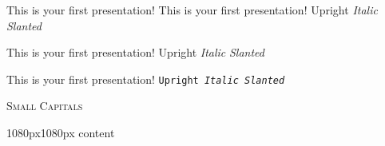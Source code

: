 \documentclass{beamer}
\begin{document}
\begin{frame}

    This is your first presentation!
	\newline
    \rmfamily This is your first presentation!
	\newline
	\textup{Upright} \textit{Italic} \textsl{Slanted}
	\newline


    \sffamily This is your first presentation!
	\newline
	\textsf{Upright  \textit{Italic} \textsl{Slanted}}
	\newline

    \ttfamily This is your first presentation!
	\newline
	\texttt{Upright  \textit{Italic} \textsl{Slanted}}
	\newline

	\textsc{Small Capitals}

\end{frame}

\begin{overlayarea}{1080px}{1080px}
  content
\end{overlayarea}
\end{document}
